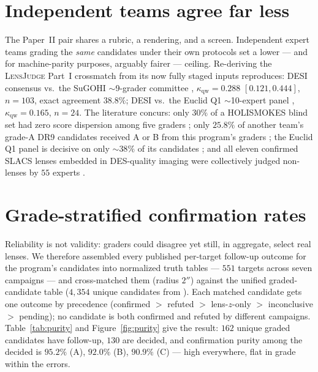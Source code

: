 \documentclass[11pt,letterpaper]{article}
\newcommand{\lj}{\textsc{LensJudge}}
\newcommand{\qwk}{\ensuremath{\kappa_{\mathrm{qw}}}}
\begin{document}
\section{Independent teams agree far less}\label{sec:crossteam}
The Paper~II pair shares a rubric, a rendering, and a screen. Independent expert teams grading
the \emph{same} candidates under their own protocols set a lower --- and for machine-parity
purposes, arguably fairer --- ceiling. Re-deriving the \lj{} Part~I crossmatch from its now
fully staged inputs reproduces: DESI consensus vs.\ the SuGOHI $\sim$9-grader committee
\citep{sonnenfeld2018sugohi}, $\qwk = 0.288$ $[0.121, 0.444]$, $n=103$, exact agreement
$38.8\%$; DESI vs.\ the Euclid Q1 $\sim$10-expert panel \citep{euclidq1engine},
$\qwk = 0.165$, $n=24$. The literature concurs: only $30\%$ of a HOLISMOKES blind set had zero
score dispersion among five graders \citep{canameras2021holismokes}; only $25.8\%$ of another
team's grade-A DR9 candidates received A or B from this program's graders
\citep{storfer2024dr9}; the Euclid Q1 panel is decisive on only $\sim$$38\%$ of its candidates
\citep{euclidq1engine}; and all eleven confirmed SLACS lenses embedded in DES-quality imaging
were collectively judged non-lenses by $55$ experts \citep{rojas2023vi}.

\section{Grade-stratified confirmation rates}\label{sec:purity}
Reliability is not validity: graders could disagree yet still, in aggregate, select real
lenses. We therefore assembled every published per-target follow-up outcome for the program's
candidates into normalized truth tables --- $551$ targets across seven campaigns --- and
cross-matched them (radius $2''$) against the unified graded-candidate table ($4{,}354$ unique
candidates from \citealt{huang2020decals,huang2021desi,storfer2024dr9,inchausti2025}). Each
matched candidate gets one outcome by precedence (confirmed $>$ refuted $>$ lens-$z$-only $>$
inconclusive $>$ pending); no candidate is both confirmed and refuted by different campaigns.
Table~\ref{tab:purity} and Figure~\ref{fig:purity} give the result: $162$ unique graded
candidates have follow-up, $130$ are decided, and confirmation purity among the decided is
$95.2\%$ (A), $92.0\%$ (B), $90.9\%$ (C) --- high everywhere, flat in grade within the errors.
\end{document}
